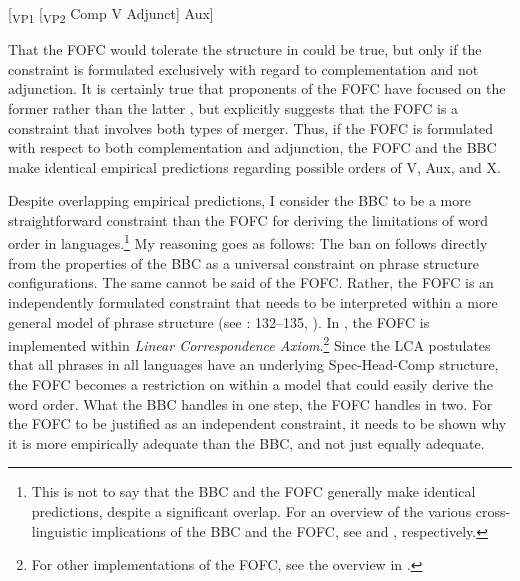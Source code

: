 \documentclass[output=paper, colorlinks, citecolor=brown]{langscibook}
\begin{document}
\ea {}[\textsubscript{VP1} [\textsubscript{VP2} {Comp} {V} {Adjunct}] {Aux}]\label{ex:sangfelt:10}\z


That the FOFC would tolerate the structure in  could be true, but only if the constraint is formulated exclusively with regard to complementation and not adjunction. It is certainly true that proponents of the FOFC have focused on the former rather than the latter \citep[97]{Sheehan2017Final}, but \citet{Sheehan2017Final} explicitly suggests that the FOFC is a constraint that involves both types of merger. Thus, if the FOFC is formulated with respect to both complementation and adjunction, the FOFC and the BBC make identical empirical predictions regarding possible orders of V, Aux, and X.

Despite overlapping empirical predictions, I consider the BBC to be a more straightforward constraint than the FOFC for deriving the limitations of  word order in  languages.\footnote{This is not to say that the BBC and the FOFC generally make identical predictions, despite a significant overlap. For an overview of the various cross-linguistic implications of the BBC and the FOFC, see \citet[10–17, 65–94]{Haider2013} and \citet[173–205]{BiberauerEtAl2014}, respectively.} My reasoning goes as follows: The ban on  follows directly from the properties of the BBC as a universal constraint on phrase structure configurations. The same cannot be said of the FOFC. Rather, the FOFC is an independently formulated constraint that needs to be interpreted within a more general model of phrase structure (see \citealt{Haider2013}: 132–135, \citealt[205–215]{BiberauerEtAl2014}). In \citet{BiberauerEtAl2014}, the FOFC is implemented within  \textit{Linear Correspondence Axiom}.\footnote{For other implementations of the FOFC, see the overview in \citet{Holmberg2017}.}  Since the LCA postulates that all phrases in all languages have an underlying Spec-Head-Comp structure, the FOFC becomes a restriction on  within a model that could easily derive the  word order. What the BBC handles in one step, the FOFC handles in two. For the FOFC to be justified as an independent constraint, it needs to be shown why it is more empirically adequate than the BBC, and not just equally adequate.
\end{document}
